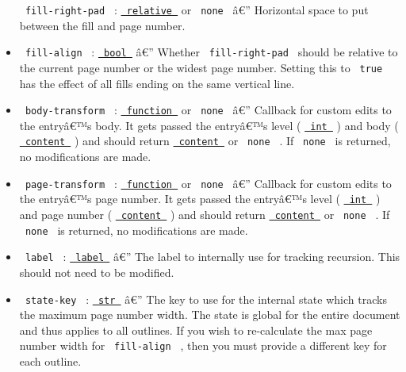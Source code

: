 \begin{itemize}
  \texttt{\ fill-right-pad\ } :
  \href{https://typst.app/docs/reference/layout/relative/}{\texttt{\ relative\ }}
  or \texttt{\ none\ } â€'' Horizontal space to put between the fill and
  page number.
\item
  \texttt{\ fill-align\ } :
  \href{https://typst.app/docs/reference/foundations/bool/}{\texttt{\ bool\ }}
  â€'' Whether \texttt{\ fill-right-pad\ } should be relative to the
  current page number or the widest page number. Setting this to
  \texttt{\ true\ } has the effect of all fills ending on the same
  vertical line.
\item
  \texttt{\ body-transform\ } :
  \href{https://typst.app/docs/reference/foundations/function/}{\texttt{\ function\ }}
  or \texttt{\ none\ } â€'' Callback for custom edits to the entryâ€™s
  body. It gets passed the entryâ€™s level (
  \href{https://typst.app/docs/reference/foundations/int/}{\texttt{\ int\ }}
  ) and body (
  \href{https://typst.app/docs/reference/foundations/content/}{\texttt{\ content\ }}
  ) and should return
  \href{https://typst.app/docs/reference/foundations/content/}{\texttt{\ content\ }}
  or \texttt{\ none\ } . If \texttt{\ none\ } is returned, no
  modifications are made.
\item
  \texttt{\ page-transform\ } :
  \href{https://typst.app/docs/reference/foundations/function/}{\texttt{\ function\ }}
  or \texttt{\ none\ } â€'' Callback for custom edits to the entryâ€™s
  page number. It gets passed the entryâ€™s level (
  \href{https://typst.app/docs/reference/foundations/int/}{\texttt{\ int\ }}
  ) and page number (
  \href{https://typst.app/docs/reference/foundations/content/}{\texttt{\ content\ }}
  ) and should return
  \href{https://typst.app/docs/reference/foundations/content/}{\texttt{\ content\ }}
  or \texttt{\ none\ } . If \texttt{\ none\ } is returned, no
  modifications are made.
\item
  \texttt{\ label\ } :
  \href{https://typst.app/docs/reference/foundations/label/}{\texttt{\ label\ }}
  â€'' The label to internally use for tracking recursion. This should
  not need to be modified.
\item
  \texttt{\ state-key\ } :
  \href{https://typst.app/docs/reference/foundations/str/}{\texttt{\ str\ }}
  â€'' The key to use for the internal state which tracks the maximum
  page number width. The state is global for the entire document and
  thus applies to all outlines. If you wish to re-calculate the max page
  number width for \texttt{\ fill-align\ } , then you must provide a
  different key for each outline.
\end{itemize}

